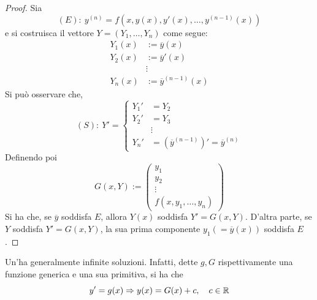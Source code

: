 \begin{proof}
    Sia
    \begin{equation}
  (E):\ y^{(n)}=f\left(x, y(x), y'(x), \dots, y^{(n-1)}(x)\right)
    \end{equation}
    e si costruisca il vettore $Y=(Y_1, \dots, Y_n)$ come segue: 
    \begin{equation}
        \begin{aligned}
        Y_1(x)&:= \overline{y}(x)\\
        Y_2(x)&:= \overline{y}'(x)\\
            &\vdots\\
        Y_n(x)&:= \overline{y}^{(n-1)}(x)
        \end{aligned}
    \end{equation}
    Si può osservare che,
    \begin{equation}
      (S):\ Y'= \begin{cases}
            Y_1'&= Y_2\\
            Y_2'&=Y_3\\
            &\vdots\\
            Y_n'&= \left(\overline{y}^{(n-1)}\right)'=\overline{y}^{(n)}
        \end{cases}
    \end{equation}
    Definendo poi
    \begin{equation}
        G(x, Y) := \begin{pmatrix}
            y_1\\
            y_2\\
            \vdots\\
            f(x, y_1, \dots, y_n)
        \end{pmatrix}
    \end{equation}
    Si ha che, se $\overline{y}$ soddisfa $E$, allora $Y(x)$
    soddisfa $Y'=G(x, Y)$. D'altra parte, se $Y$ soddisfa $Y'=G(x, Y)$, la sua prima componente $y_1(=\overline{y}(x))$ soddisfa $E$.
\end{proof}
\begin{oss}
Un'\ode ha generalmente infinite soluzioni. Infatti, dette $g, G$ rispettivamente una funzione generica e una sua primitiva, si ha che
\begin{equation}
    y'= g(x) \Rightarrow y(x)= G(x)+c,\quad c \in \mathbb{R}
\end{equation}
\end{oss}
